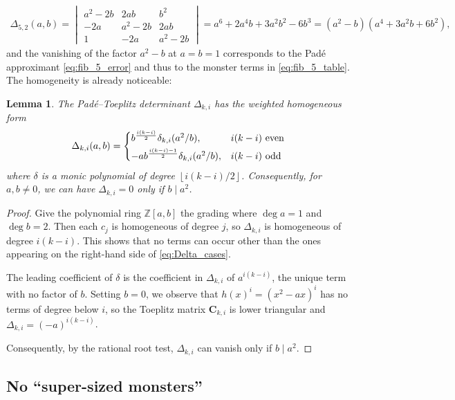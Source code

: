 \documentclass{article}
\numberwithin{equation}{section}
\newtheorem{lem}[thm]{Lemma}
\theoremstyle{definition}
\theoremstyle{remark}
\newcommand{\ZZ}{\mathbb{Z}}
\newcommand{\floor}[1]{\left\lfloor #1 \right\rfloor}
\newcommand{\<}{\left\langle}
\renewcommand{\>}{\right\rangle}
\begin{document}
\begin{equation} \label{eq:Delta_factored}
  \begin{gathered}
    \Delta_{5,2}(a,b) = \begin{vmatrix}
      a^2 - 2b & 2ab & b^2 \\
      -2a & a^2 - 2b & 2ab \\
      1 & -2a & a^2 - 2b
    \end{vmatrix} = a^6 + 2 a^4 b + 3 a^2 b^2 - 6 b^3
    = (a^2-b)(a^4+3a^2b+6b^2),
  \end{gathered}
\end{equation}
and the vanishing of the factor $a^2 - b$ at $a = b = 1$ corresponds to the Pad\'e approximant \eqref{eq:fib_5_error} and thus to the monster terms in \eqref{eq:fib_5_table}. The homogeneity is already noticeable:
\begin{lem}\label{lem:Delta_homog}
  The Pad\'e--Toeplitz determinant $\Delta_{k,i}$ has the weighted homogeneous form
  \begin{equation}\label{eq:Delta_cases}
    \Delta_{k,i}(a,b) = \begin{cases*}
      b^{\frac{i(k-i)}{2}} \delta_{k,i}(a^2/b), & $i(k-i)$ even \\
      - a b^{\frac{i(k-i) - 1}{2}} \delta_{k,i}(a^2/b), & $i(k-i)$ odd
    \end{cases*}
  \end{equation}
  where $\delta$ is a monic polynomial of degree $\floor{i(k-i)/2}$. Consequently, for $a, b \neq 0$, we can have $\Delta_{k,i} = 0$ only if $b \mid a^2$.
\end{lem}
\begin{proof}
  Give the polynomial ring $\ZZ[a,b]$ the grading where $\deg a = 1$ and $\deg b = 2$. Then each $c_j$ is homogeneous of degree $j$, so $\Delta_{k,i}$ is homogeneous of degree $i(k-i)$. This shows that no terms can occur other than the ones appearing on the right-hand side of \eqref{eq:Delta_cases}.

  The leading coefficient of $\delta$ is the coefficient in $\Delta_{k,i}$ of $a^{i(k-i)}$, the unique term with no factor of $b$. Setting $b = 0$, we observe that $h(x)^i = (x^2 - ax)^i$ has no terms of degree below $i$, so the Toeplitz matrix $\mathbf{C}_{k,i}$ is lower triangular and $\Delta_{k,i} = (-a)^{i(k-i)}$.

  Consequently, by the rational root test, $\Delta_{k,i}$ can vanish only if $b \mid a^2$.
\end{proof}

\subsection{No ``super-sized monsters''}
\end{document}
